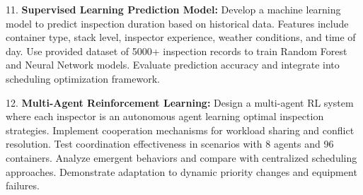 \documentclass{article}
\begin{document}
11. \textbf{Supervised Learning Prediction Model:} Develop a machine learning model to predict inspection duration based on historical data. Features include container type, stack level, inspector experience, weather conditions, and time of day. Use provided dataset of 5000+ inspection records to train Random Forest and Neural Network models. Evaluate prediction accuracy and integrate into scheduling optimization framework.

12. \textbf{Multi-Agent Reinforcement Learning:} Design a multi-agent RL system where each inspector is an autonomous agent learning optimal inspection strategies. Implement cooperation mechanisms for workload sharing and conflict resolution. Test coordination effectiveness in scenarios with 8 agents and 96 containers. Analyze emergent behaviors and compare with centralized scheduling approaches. Demonstrate adaptation to dynamic priority changes and equipment failures.
\end{document}
